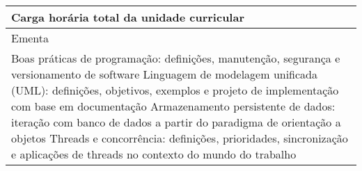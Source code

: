 \begin{quadro}[h!]
\begin{tabular}{|p{3cm} p{2cm} p{3cm} p{2cm} p{3cm} p{2cm}|}
\multicolumn{5}{|p{13cm}|}{\cellcolor{blue1} Carga horária total da unidade curricular} & \multicolumn{1}{p{1cm}|}{\raggedleft 90	}\\\hline
\multicolumn{6}{|p{15cm}|}{\cellcolor{blue1} Ementa} \\\hline
\hline\multicolumn{6}{|p{15cm}|}{\scriptsize Boas práticas de programação: definições, manutenção, segurança e versionamento de software Linguagem de modelagem unificada (UML): definições, objetivos, exemplos e projeto de implementação com base em documentação Armazenamento persistente de dados: iteração com banco de dados a partir do paradigma de orientação a objetos Threads e concorrência: definições, prioridades, sincronização e aplicações de threads no contexto do mundo do trabalho}\\\hline
\hline
	\end{tabular}
\end{quadro}
